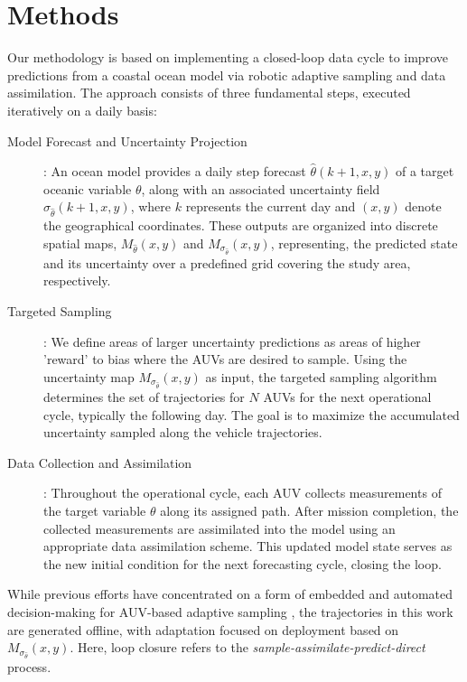 \section{Methods}
\label{sec:methods}


Our methodology is based on implementing a closed-loop data cycle to
improve predictions from a coastal ocean model via robotic adaptive
sampling and data assimilation. The approach consists of three
fundamental steps, executed iteratively on a daily basis:

\begin{description}

\item [Model Forecast and Uncertainty Projection]: An ocean model
  provides a daily step forecast $\hat{\theta}(k+1, x, y)$ of a
  target oceanic variable $\theta$, along with an associated
  uncertainty field $\sigma_{\hat{\theta}}(k+1, x, y)$, where $k$
  represents the current day and $(x, y)$ denote the geographical
  coordinates. These outputs are organized into discrete spatial maps,
  $M_{\hat{\theta}}(x, y)$ and $M_{\sigma_{\hat{\theta}}}(x, y)$,
  representing, the predicted state and its uncertainty over a
  predefined grid covering the study area, respectively.

\item [Targeted Sampling]: We define areas of larger uncertainty
  predictions as areas of higher 'reward' to bias where the AUVs are
  desired to sample. Using the uncertainty map
  $M_{\sigma_{\hat{\theta}}}(x, y)$ as input, the targeted sampling
  algorithm determines the set of trajectories for $N$ AUVs for the
  next operational cycle, typically the following day. The goal is to
  maximize the accumulated uncertainty sampled along the vehicle
  trajectories.

\item [Data Collection and Assimilation]: Throughout the operational
  cycle, each AUV collects measurements of the target variable
  $\theta$ along its assigned path. After mission completion, the
  collected measurements are assimilated into the model using an
  appropriate data assimilation scheme. This updated model state
  serves as the new initial condition for the next forecasting cycle,
  closing the loop.

\end{description}

While previous efforts have concentrated on a form of embedded and
automated decision-making for AUV-based adaptive sampling
\parencite{mcgann08b,ryan10,olaya12,rajan12}, the trajectories in this
work are generated offline, with adaptation focused on deployment
based on $M_{\sigma_{\hat{\theta}}}(x, y)$. Here, loop closure refers
to the \emph{sample-assimilate-predict-direct} process.

